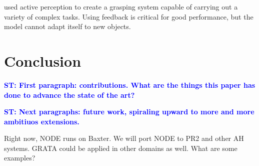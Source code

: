 \documentclass[conference]{IEEEtran}
\newcommand{\stnote}[1]{\textcolor{blue}{\textbf{ST: #1}}}
\begin{document}
\citet{hudson12} used active perception to create a grasping system
capable of carrying out a variety of complex tasks.  Using feedback is
critical for good performance, but the model cannot adapt itself to
new objects.



\section{Conclusion}

\stnote{First paragraph:  contributions.  What are the things this paper has done to advance the state of the art?}

\stnote{Next paragraphs: future work, spiraling upward to more and
  more ambitiuos extensions.}

Right now, NODE runs on Baxter. We will port NODE to PR2 and other AH systems.
GRATA could be applied in other domains as well.  What are some examples?


%



\end{document}
